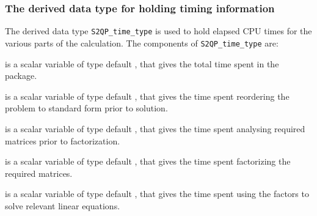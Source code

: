 \documentclass{galahad}
\newcommand{\packagename}{S2QP}
\begin{document}
\subsubsection{The derived data type for holding timing
 information}\label{typetime}
The derived data type
{\tt \packagename\_time\_type}
is used to hold elapsed CPU times for the various parts of the calculation.
The components of
{\tt \packagename\_time\_type}
are:
\begin{description}
 is a scalar variable of type default \real, that gives
 the total time spent in the package.

 is a scalar variable of type default \real, that gives
 the time spent reordering the problem to standard form prior to solution.

 is a scalar variable of type default \real, that gives
 the time spent analysing required matrices prior to factorization.

 is a scalar variable of type default \real, that gives
 the time spent factorizing the required matrices.

 is a scalar variable of type default \real, that gives
 the time spent using the factors to solve relevant linear equations.















\end{description}
\end{document}
